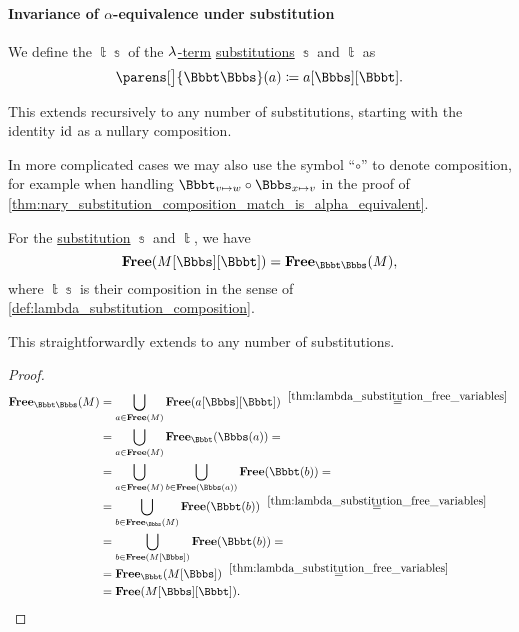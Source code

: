 \paragraph{Invariance of \( \alpha \)-equivalence under substitution}

\begin{definition}\label{def:lambda_substitution_composition}\mimprovised
  We define the  \( \Bbbt\Bbbs \) of the \hyperref[def:lambda_term]{\( {\mathrm \lambda} \)-term} \hyperref[def:lambda_term_substitution]{substitutions} \( \Bbbs \) and \( \Bbbt \) as
  \begin{equation}\label{eq:def:lambda_substitution_composition}
    \parens[\big]{ \Bbbt\Bbbs }(a) \coloneqq a[\Bbbs][\Bbbt].
  \end{equation}

  This extends recursively to any number of substitutions, starting with the identity \( \operatorname{id} \) as a nullary composition.
\end{definition}
\begin{comments}
  \item In more complicated cases we may also use the symbol \enquote{\( \circ \)} to denote composition, for example when handling \( \Bbbt_{v \mapsto w} \bincirc \Bbbs_{x \mapsto v} \) in the proof of \cref{thm:nary_substitution_composition_match_is_alpha_equivalent}.
\end{comments}

\begin{lemma}\label{thm:substitution_composition_free_variables}
  For the \hyperref[def:lambda_term_substitution]{substitution} \( \Bbbs \) and \( \Bbbt \), we have
  \begin{equation}\label{eq:thm:thm:substitution_composition_free_variables}
    \op*{Free}(M[\Bbbs][\Bbbt]) = \op*{Free}_{\Bbbt\Bbbs}(M),
  \end{equation}
  where \( \Bbbt\Bbbs \) is their composition in the sense of \cref{def:lambda_substitution_composition}.

  This straightforwardly extends to any number of substitutions.
\end{lemma}
\begin{proof}
  \begin{align*}
    \op*{Free}_{\Bbbt\Bbbs}(M)
    &=
    \bigcup_{a \in \op*{Free}(M)} \op*{Free}(a[\Bbbs][\Bbbt])
    \reloset {\ref{thm:lambda_substitution_free_variables}} = \\ &=
    \bigcup_{a \in \op*{Free}(M)} \op*{Free}_\Bbbt(\Bbbs(a))
    = \\ &=
    \bigcup_{a \in \op*{Free}(M)} \bigcup_{b \in \op*{Free}(\Bbbs(a))} \op*{Free}(\Bbbt(b))
    = \\ &=
    \bigcup_{b \in \op*{Free}_\Bbbs(M)} \op*{Free}(\Bbbt(b))
    \reloset {\ref{thm:lambda_substitution_free_variables}} = \\ &=
    \bigcup_{b \in \op*{Free}(M[\Bbbs])} \op*{Free}(\Bbbt(b))
    = \\ &=
    \op*{Free}_\Bbbt(M[\Bbbs])
    \reloset {\ref{thm:lambda_substitution_free_variables}} = \\ &=
    \op*{Free}(M[\Bbbs][\Bbbt]).
  \end{align*}
\end{proof}

